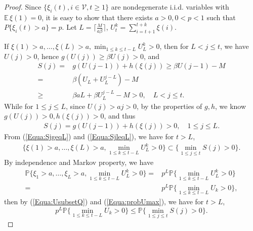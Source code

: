 \documentclass[11pt]{article}
\theoremstyle{definition}
\theoremstyle{remark}
\numberwithin{equation}{section}
\begin{document}
\begin{proof}
Since $\{\xi_i(t), i\in\mathcal{V}, t\geq 1\}$ are nondegenerate i.i.d. variables with $\mathbb{E}\,\xi(1)=0$, it is easy to show that there exists $a>0, 0<p<1$ such that $P\{\xi_i(t)> a\}= p$. Let $L=\lceil\frac{M}{a\beta}\rceil$, $U_t^k=\sum_{i=t+1}^{t+k}\xi(i)$.

If $\xi(1)>a, \ldots, \xi(L)>a, \min_{1\leq k\leq t-L}U_{L}^k>0$, then for $L<j\leq t$, we have $U(j)>0$, hence $g(U(j))\geq \beta U(j)>0$, and
\begin{equation}\label{Equa:SjgeqL}
\begin{split}
  S(j)=&g(U(j-1))+h(\xi(j))\geq \beta U(j-1)-M\\
  =&\beta(U_L+U_L^{j-L})-M\\
  \geq& \beta aL+\beta U_L^{j-L}-M>0,\quad L< j\leq t.
\end{split}
\end{equation}
While for $1\leq j\leq L$, since $U(j)>aj>0$, by the properties of $g, h$, we know $g(U(j))>0, h(\xi(j))>0$, and thus
\begin{equation}\label{Equa:SjleqL}
\begin{split}
  S(j)=g(U(j-1))+h(\xi(j))>0,\quad 1\leq j\leq L.
\end{split}
\end{equation}
From (\ref{Equa:SjgeqL}) and (\ref{Equa:SjleqL}), we have for $t>L$,
\begin{equation}\label{Equa:UsubsetQ}
\begin{split}
  \Big\{\xi(1)>a, \ldots, \xi(L)>a, \min_{1\leq k\leq t-L}U_L^k>0\Big\}\subset\Big\{\min_{1\leq j\leq t} S(j)>0\Big\}.
  \end{split}
\end{equation}
By independence and Markov property, we have
\begin{equation}\label{Equa:probUmax}
\begin{split}
  \mathbb{P}\Big\{\xi_1>a, \ldots, \xi_L>a, \min_{1\leq k\leq t-L}U_L^k>0\Big\}=&p^L\mathbb{P}\Big\{\min_{1\leq k\leq t-L}U_{L}^k>0\Big\}\\
  =&p^L\mathbb{P}\Big\{\min_{1\leq k\leq t-L}U_k>0\Big\},
\end{split}
\end{equation}
then by (\ref{Equa:UsubsetQ}) and (\ref{Equa:probUmax}), we have for $t>L$,
\begin{equation}\label{Equa:probUlessprobQ}
  p^L\mathbb{P}\Big\{\min_{1\leq k\leq t-L}U_k>0\Big\}\leq \mathbb{P}\Big\{\min_{1\leq j\leq t} S(j)>0\Big\}.
\end{equation}

\end{proof}
\end{document}
